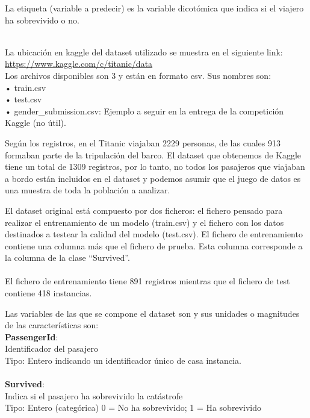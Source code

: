 \documentclass[
]{article}
\begin{document}
La etiqueta (variable a predecir) es la variable dicotómica que indica
si el viajero ha sobrevivido o no.

\texttt{}\\
La ubicación en kaggle del dataset utilizado se muestra en el siguiente
link: \texttt{}\\
\url{https://www.kaggle.com/c/titanic/data} \texttt{}~\\
Los archivos disponibles son 3 y están en formato csv. Sus nombres son:
\texttt{}\\
• train.csv\\
• test.csv\\
• gender\_submission.csv: Ejemplo a seguir en la entrega de la
competición Kaggle (no útil).\\
\texttt{}

Según los registros, en el Titanic viajaban 2229 personas, de las cuales
913 formaban parte de la tripulación del barco. El dataset que obtenemos
de Kaggle tiene un total de 1309 registros, por lo tanto, no todos los
pasajeros que viajaban a bordo están incluidos en el dataset y podemos
asumir que el juego de datos es una muestra de toda la población a
analizar. \texttt{}

El dataset original está compuesto por dos ficheros: el fichero pensado
para realizar el entrenamiento de un modelo (train.csv) y el fichero con
los datos destinados a testear la calidad del modelo (test.csv). El
fichero de entrenamiento contiene una columna más que el fichero de
prueba. Esta columna corresponde a la columna de la clase
``Survived''.\\
\texttt{}~\\
El fichero de entrenamiento tiene 891 registros mientras que el fichero
de test contiene 418 instancias.\\
\texttt{}

Las variables de las que se compone el dataset son y sus unidades o
magnitudes de las características son: \texttt{}\\
\textbf{PassengerId}:\\
Identificador del pasajero\\
Tipo: Entero indicando un identificador único de casa instancia.\\
\texttt{}~\\

\textbf{Survived}:\\
Indica si el pasajero ha sobrevivido la catástrofe\\
Tipo: Entero (categórica) 0 = No ha sobrevivido; 1 = Ha sobrevivido\\
\texttt{}~\\
\end{document}
